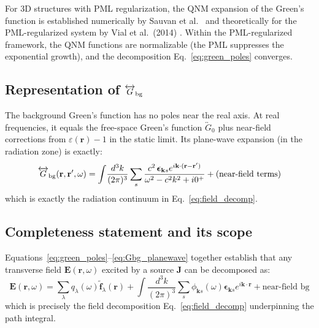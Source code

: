 \documentclass[12pt]{article}
\newcommand{\tf}{\tilde{\mathbf{f}}}
\begin{document}
For 3D structures with PML regularization, the QNM expansion of the
Green's function is established numerically by Sauvan et al.\ \cite{Sauvan2013}
and theoretically for the PML-regularized system by Vial et al.\ (2014)
\cite{Lalanne2018}.  Within the PML-regularized framework, the QNM functions
are normalizable (the PML suppresses the exponential growth), and the
decomposition Eq.~\eqref{eq:green_poles} converges.

\subsection*{Representation of $\overleftrightarrow{G}_{\rm bg}$}

The background Green's function has no poles near the real axis.  At
real frequencies, it equals the free-space Green's function
$\overleftrightarrow{G}_0$ plus near-field corrections from
$\varepsilon(\mathbf{r})-1$ in the static limit.  Its plane-wave expansion
(in the radiation zone) is exactly:
\begin{equation}
  \overleftrightarrow{G}_{\rm bg}(\mathbf{r},\mathbf{r}',\omega) =
  \int\!\frac{d^3k}{(2\pi)^3}\sum_s
  \frac{c^2\,\boldsymbol{\epsilon}_{\mathbf{k}s}e^{i\mathbf{k}\cdot(\mathbf{r}-\mathbf{r}')}}
  {\omega^2-c^2k^2+i0^+}
  +\text{(near-field terms)}
  \label{eq:Gbg_planewave}
\end{equation}
which is exactly the radiation continuum in Eq.~\eqref{eq:field_decomp}.

\subsection*{Completeness statement and its scope}

Equations~\eqref{eq:green_poles}--\eqref{eq:Gbg_planewave} together
establish that any transverse field $\mathbf{E}(\mathbf{r},\omega)$
excited by a source $\mathbf{J}$ can be decomposed as:
\begin{equation}
  \mathbf{E}(\mathbf{r},\omega) = \sum_\lambda q_\lambda(\omega)
  \tf_\lambda(\mathbf{r}) + \int\!\frac{d^3k}{(2\pi)^3}\sum_s
  \phi_{\mathbf{k}s}(\omega)\boldsymbol{\epsilon}_{\mathbf{k}s}
  e^{i\mathbf{k}\cdot\mathbf{r}} + \text{near-field bg}
\end{equation}
which is precisely the field decomposition Eq.~\eqref{eq:field_decomp}
underpinning the path integral.
\end{document}
